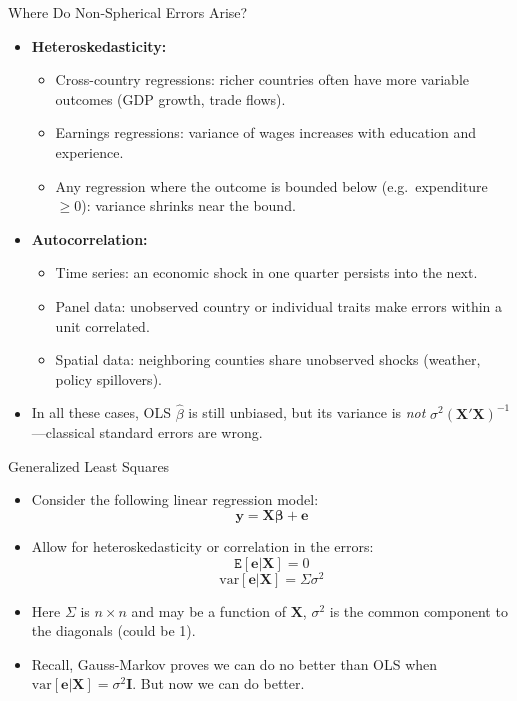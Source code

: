 \documentclass[aspectratio=169, handout]{beamer}
\numberwithin{equation}{section}
\begin{document}
\begin{frame}{Where Do Non-Spherical Errors Arise?}
\begin{itemize}
\item \textbf{Heteroskedasticity:}
\begin{itemize}
\item Cross-country regressions: richer countries often have more variable outcomes (GDP growth, trade flows).
\item Earnings regressions: variance of wages increases with education and experience.
\item Any regression where the outcome is bounded below (e.g.\ expenditure $\geq 0$): variance shrinks near the bound.
\end{itemize}\pause
\item \textbf{Autocorrelation:}
\begin{itemize}
\item Time series: an economic shock in one quarter persists into the next.
\item Panel data: unobserved country or individual traits make errors within a unit correlated.
\item Spatial data: neighboring counties share unobserved shocks (weather, policy spillovers).
\end{itemize}\pause
\item In all these cases, OLS $\hat{\beta}$ is still unbiased, but its variance is \emph{not} $\sigma^2(\bm{X'X})^{-1}$---classical standard errors are wrong.
\end{itemize}
\end{frame}

\begin{frame}{Generalized Least Squares}
\begin{itemize}
\item Consider the following linear regression model:
$$\bm{y}=\bm{X\beta}+\bm{e}$$
\item Allow for heteroskedasticity or correlation in the errors:
$$\mathtt{E}[\bm{e}|\bm{X}]=0$$
$$\text{var}[\bm{e}|\bm{X}]=\Sigma\sigma^2$$
\item Here $\Sigma$ is $n\times n$ and may be a function of $\bm{X}$, $\sigma^2$ is the common component to the diagonals (could be 1).
\item Recall, Gauss-Markov proves we can do no better than OLS when $\text{var}[\bm{e}|\bm{X}]=\sigma^2\bm{I}$.  But now we can do better.
\end{itemize}
\end{frame}
\end{document}
